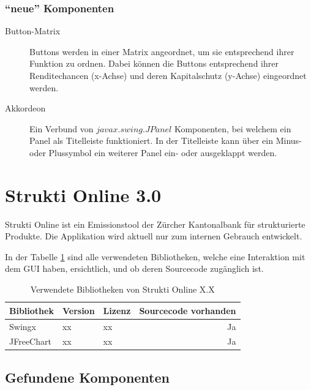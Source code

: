   \subsubsection{``neue'' Komponenten}
  
  \begin{description}
    \item[Button-Matrix]
    Buttons werden in einer Matrix angeordnet, um sie entsprechend ihrer
    Funktion zu ordnen. Dabei können die Buttons entsprechend ihrer
    Renditechancen (x-Achse) und deren Kapitalschutz (y-Achse) eingeordnet
    werden.
    \item[Akkordeon]
    Ein Verbund von \(javax.swing.JPanel\) Komponenten, bei welchem ein
    Panel als Titelleiste funktioniert. In der Titelleiste kann über ein Minus-
    oder Plussymbol ein weiterer Panel ein- oder ausgeklappt werden.
  \end{description}
  
  \section{Strukti Online 3.0}
  
  Strukti Online ist ein Emissionstool der Zürcher Kantonalbank für
  strukturierte Produkte. Die Applikation wird aktuell nur zum internen
  Gebrauch entwickelt.
  
  In der Tabelle \ref{tab:bibliothekenStruktiOnline} sind alle verwendeten
  Bibliotheken, welche eine Interaktion mit dem \ac{GUI} haben, ersichtlich,
  und ob deren Sourcecode zugänglich ist.
  
  \begin{table}[ht]
    \begin{center}
      \begin{tabular}{lllr}
        \toprule
        Bibliothek & Version & Lizenz & Sourcecode vorhanden \\
        \midrule
        Swingx & xx & xx & Ja\\
        JFreeChart & xx & xx & Ja\\
        \bottomrule
      \end{tabular}
      \caption{Verwendete Bibliotheken von Strukti Online X.X}
      \label{tab:bibliothekenStruktiOnline}
    \end{center}
  \end{table}
  
  \subsection{Gefundene Komponenten}
  
